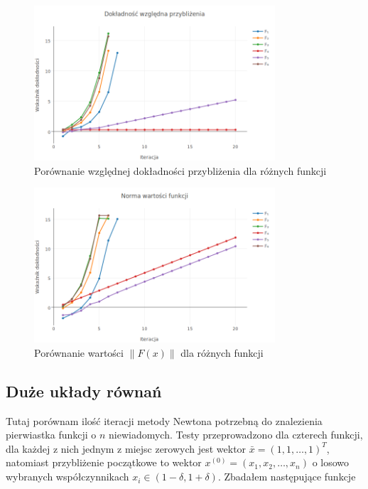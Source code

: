 \documentclass[11pt,wide]{mwart}
\begin{document}
\begin{figure}[h]
    \centering
    \includegraphics[width=0.8\textwidth]{rel_precision}
    \caption{Porównanie względnej dokładności przybliżenia dla różnych funkcji}
    \label{fig:relprecision}
\end{figure}

\begin{figure}[h]
    \centering
    \includegraphics[width=0.8\textwidth]{norm}
    \caption{Porównanie wartości $ \| F(x) \| $ dla różnych funkcji}
    \label{fig:norm}
\end{figure}

\FloatBarrier
\subsection{Duże układy równań}

Tutaj porównam ilość iteracji metody Newtona potrzebną do znalezienia pierwiastka funkcji o $ n $ niewiadomych. Testy przeprowadzono dla czterech funkcji, dla każdej z nich jednym z miejsc zerowych jest wektor $ \bar{x} = (1, 1, \ldots, 1)^T $, natomiast przybliżenie początkowe to wektor $ x^{(0)} = (x_1, x_2, \ldots, x_n )$ o losowo wybranych współczynnikach $ x_i \in (1-\delta, 1+\delta) $. Zbadałem następujące funkcje
\end{document}
